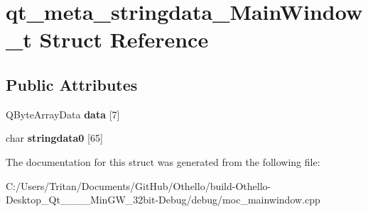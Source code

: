 \hypertarget{structqt__meta__stringdata___main_window__t}{}\section{qt\+\_\+meta\+\_\+stringdata\+\_\+\+Main\+Window\+\_\+t Struct Reference}
\label{structqt__meta__stringdata___main_window__t}
\subsection*{Public Attributes}
\begin{DoxyCompactItemize}
\item 
\hypertarget{structqt__meta__stringdata___main_window__t_a5189099cc2690b27f7fe9793cb3e2a85}{}Q\+Byte\+Array\+Data {\bfseries data} \mbox{[}7\mbox{]}\label{structqt__meta__stringdata___main_window__t_a5189099cc2690b27f7fe9793cb3e2a85}

\item 
\hypertarget{structqt__meta__stringdata___main_window__t_a675f5f5229aeff07d83ed874b3961718}{}char {\bfseries stringdata0} \mbox{[}65\mbox{]}\label{structqt__meta__stringdata___main_window__t_a675f5f5229aeff07d83ed874b3961718}

\end{DoxyCompactItemize}


The documentation for this struct was generated from the following file\+:\begin{DoxyCompactItemize}
\item 
C\+:/\+Users/\+Tritan/\+Documents/\+Git\+Hub/\+Othello/build-\/\+Othello-\/\+Desktop\+\_\+\+Qt\+\_\+\_\+\_\+\_\+\+Min\+G\+W\+\_\+32bit-\/\+Debug/debug/moc\+\_\+mainwindow.\+cpp\end{DoxyCompactItemize}
